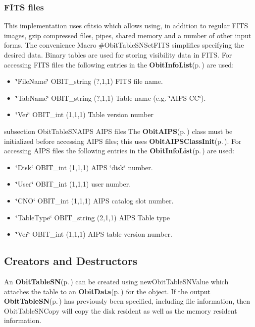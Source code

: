 \subsubsection{FITS files}\label{ObitTableWX_8h_TableFITS}
This implementation uses cfitsio which allows using, in addition to regular FITS images, gzip compressed files, pipes, shared memory and a number of other input forms. The convenience Macro \#Obit\-Table\-SNSet\-FITS simplifies specifying the desired data. Binary tables are used for storing visibility data in FITS. For accessing FITS files the following entries in the {\bf Obit\-Info\-List}{\rm (p.\,\pageref{structObitInfoList})} are used: \begin{itemize}
\item \char`\"{}File\-Name\char`\"{} OBIT\_\-string (?,1,1) FITS file name. \item \char`\"{}Tab\-Name\char`\"{} OBIT\_\-string (?,1,1) Table name (e.g. \char`\"{}AIPS CC\char`\"{}). \item \char`\"{}Ver\char`\"{} OBIT\_\-int (1,1,1) Table version number\end{itemize}
subsection Obit\-Table\-SNAIPS AIPS files The {\bf Obit\-AIPS}{\rm (p.\,\pageref{structObitAIPS})} class must be initialized before accessing AIPS files; this uses {\bf Obit\-AIPSClass\-Init}{\rm (p.\,\pageref{ObitAIPS_8c_a5})}. For accessing AIPS files the following entries in the {\bf Obit\-Info\-List}{\rm (p.\,\pageref{structObitInfoList})} are used: \begin{itemize}
\item \char`\"{}Disk\char`\"{} OBIT\_\-int (1,1,1) AIPS \char`\"{}disk\char`\"{} number. \item \char`\"{}User\char`\"{} OBIT\_\-int (1,1,1) user number. \item \char`\"{}CNO\char`\"{} OBIT\_\-int (1,1,1) AIPS catalog slot number. \item \char`\"{}Table\-Type\char`\"{} OBIT\_\-string (2,1,1) AIPS Table type \item \char`\"{}Ver\char`\"{} OBIT\_\-int (1,1,1) AIPS table version number.\end{itemize}
\subsection{Creators and Destructors}\label{ObitTableSN_8h_ObitTableSNaccess}
An {\bf Obit\-Table\-SN}{\rm (p.\,\pageref{structObitTableSN})} can be created using new\-Obit\-Table\-SNValue which attaches the table to an {\bf Obit\-Data}{\rm (p.\,\pageref{structObitData})} for the object. If the output {\bf Obit\-Table\-SN}{\rm (p.\,\pageref{structObitTableSN})} has previously been specified, including file information, then Obit\-Table\-SNCopy will copy the disk resident as well as the memory resident information.

